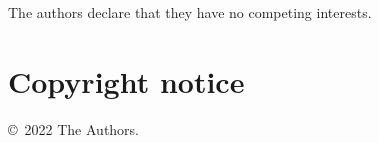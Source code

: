 \documentclass[a4paper]{article}
\begin{document}
	The authors declare that they have no competing interests.
	
	
	
	
	
	\section*{Copyright notice}\label{h.jm5gcqv4g8x0}
	
	\copyright~2022 The Authors. %
	
	
	
\end{document}
